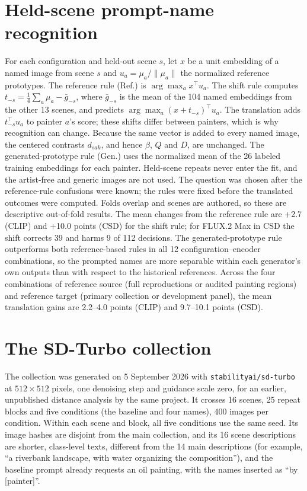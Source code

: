 \FloatBarrier
\section{Held-scene prompt-name recognition}\label{app:transfer}



For each configuration and held-out scene $s$, let $x$ be a unit embedding of a named image
from scene $s$ and $u_a=\mu_a/\|\mu_a\|$ the normalized reference prototypes. The reference rule
(Ref.) is $\arg\max_a x^\top u_a$. The shift rule computes $t_{-s}=\frac14\sum_a\mu_a-\bar
g_{-s}$, where $\bar g_{-s}$ is the mean of the 104 named embeddings from the other 13 scenes,
and predicts $\arg\max_a(x+t_{-s})^\top u_a$. The translation adds $t_{-s}^\top u_a$ to painter
$a$'s score; these shifts differ between painters, which is why recognition can change. Because the
same vector is added to every named image, the centered contrasts $d_{sak}$, and hence $\beta$, $Q$
and $D$, are unchanged. The generated-prototype rule (Gen.) uses the normalized mean of the 26
labeled training embeddings for each painter. Held-scene repeats never enter the fit, and the
artist-free and generic images are not used. The question was chosen after the reference-rule
confusions were known; the rules were fixed before the translated outcomes were computed. Folds
overlap and scenes are authored, so these are descriptive out-of-fold results. The mean changes
from the reference rule are +2.7 (CLIP) and +10.0 points (CSD) for the shift rule; for FLUX.2 Max in
CSD the shift corrects 39 and harms 9 of 112 decisions. The generated-prototype rule outperforms
both reference-based rules in all 12 configuration--encoder combinations, so the prompted names
are more separable within each generator's own outputs than with respect to the historical
references. Across the four
combinations of reference source (full reproductions or audited painting regions) and reference
target (primary collection or development panel), the mean translation gains are 2.2--4.0 points
(CLIP) and 9.7--10.1 points (CSD).

\FloatBarrier
\section{The SD-Turbo collection}\label{app:sdturbo}

The collection was generated on 5 September 2026 with \texttt{stabilityai/sd-turbo} at
$512\times512$ pixels, one denoising step and guidance scale zero, for an earlier, unpublished
distance analysis by the same project. It crosses 16 scenes, 25 repeat blocks and five
conditions (the baseline and four names), 400 images per condition. Within each scene and
block, all five conditions use the same seed. Its image hashes are disjoint from the main
collection, and its 16 scene descriptions are shorter, class-level texts, different from the 14
main descriptions (for example, ``a riverbank landscape, with water organizing the
composition''), and the baseline prompt already requests an oil painting, with the names inserted
as ``by [painter]''.

